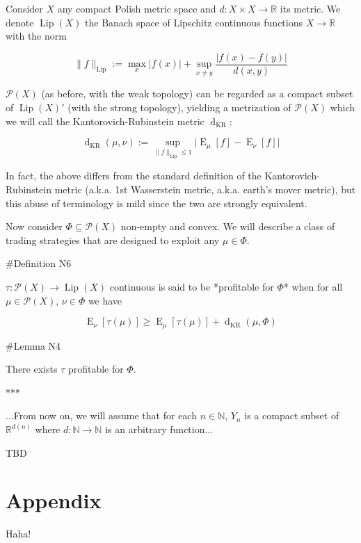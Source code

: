\documentclass[a4paper]{article}
\DeclareMathOperator{\E}{E}
\newcommand{\Nats}{\mathbb{N}}
\newcommand{\Reals}{\mathbb{R}}
\newcommand{\Abs}[1]{\lvert #1 \rvert}
\newcommand{\Norm}[1]{\lVert #1 \rVert}
\newcommand{\Prob}{\mathcal{P}}
\newcommand{\Lip}{\operatorname{Lip}}
\newcommand{\NormL}[1]{\Norm{#1}_{\operatorname{Lip}}}
\newcommand{\Dkr}{\operatorname{d}_{\text{KR}}}
\begin{document}
Consider ${X}$ any compact Polish metric space and ${d: X \times X \rightarrow \Reals}$ its metric. We denote ${\Lip(X)}$ the Banach space of Lipschitz continuous functions ${X \rightarrow \Reals}$ with the norm

$$\NormL{f}:=\max_{x} \Abs{f(x)} + \sup_{x \ne y}\frac{\Abs{f(x)-f(y)}}{d(x,y)}$$

${\Prob(X)}$ (as before, with the weak topology) can be regarded as a compact subset of ${\Lip(X)'}$ (with the strong topology), yielding a metrization of ${\Prob(X)}$ which we will call the Kantorovich-Rubinstein metric ${\Dkr}$:

$$\Dkr(\mu,\nu):=\sup_{\NormL{f} \leq 1} \Abs{\E_\mu[f] - \E_\nu[f]}$$

In fact, the above differs from the standard definition of the Kantorovich-Rubinstein metric (a.k.a. 1st Wasserstein metric, a.k.a. earth's mover metric), but this abuse of terminology is mild since the two are strongly equivalent.

Now consider ${\Phi \subseteq \Prob(X)}$ non-empty and convex. We will describe a class of trading strategies that are designed to exploit any ${\mu \in \Phi}$.

\#Definition N6

${\tau: \Prob(X) \rightarrow \Lip(X)}$ continuous is said to be *profitable for ${\Phi}$* when for all ${\mu \in \Prob(X)}$, ${\nu \in \Phi}$ we have

$$\E_\nu[\tau(\mu)] \geq \E_\mu[\tau(\mu)] + \Dkr(\mu,\Phi)$$

\#Lemma N4

There exists ${\tau}$ profitable for ${\Phi}$.

***

...From now on, we will assume that for each ${n \in \Nats}$, ${Y_n}$ is a compact subset of ${\Reals^{d(n)}}$ where ${d: \Nats \rightarrow \Nats}$ is an arbitrary function...

TBD


\section{Appendix}

Haha!
\end{document}
